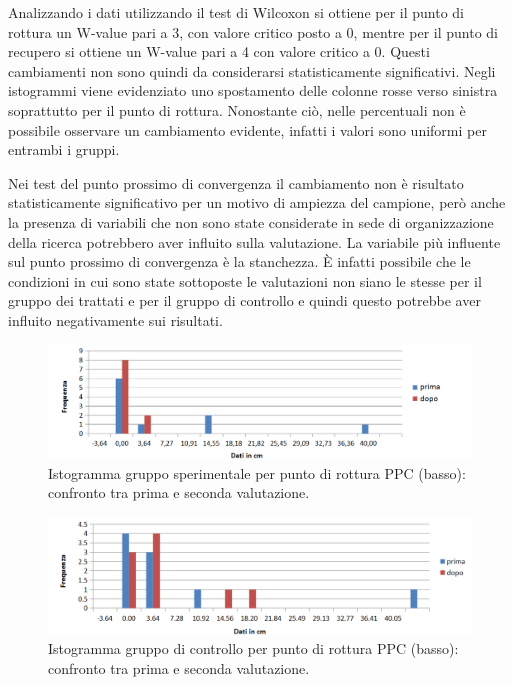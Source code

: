 Analizzando i dati utilizzando il test di Wilcoxon si ottiene per il punto di rottura un W-value pari a 3, con valore critico posto a 0, mentre per il punto di recupero si ottiene un W-value pari a 4 con valore critico a 0. Questi cambiamenti non sono quindi da considerarsi statisticamente significativi. Negli istogrammi viene evidenziato uno spostamento delle colonne rosse verso sinistra soprattutto per il punto di rottura. Nonostante ciò, nelle percentuali non è possibile osservare un cambiamento evidente, infatti i valori sono uniformi per entrambi i gruppi. 

Nei test del punto prossimo di convergenza il cambiamento non è risultato statisticamente significativo per un motivo di ampiezza del campione, però anche la presenza di variabili che non sono state considerate in sede di organizzazione della ricerca potrebbero aver influito sulla valutazione. La variabile più influente sul punto prossimo di convergenza è la stanchezza. È infatti possibile che le condizioni in cui sono state sottoposte le valutazioni non siano le stesse per il gruppo dei trattati e per il gruppo di controllo e quindi questo potrebbe aver influito negativamente sui risultati.
 \begin{figure}[h!]
	\centering
	\includegraphics[scale=0.38]{source/grafici/PPC_BASSO_DEFINITIVO.png}
	\caption[Istogramma gruppo sperimentale per punto di rottura PPC (basso)]{Istogramma gruppo sperimentale per punto di rottura PPC (basso): confronto tra prima e seconda valutazione.}
	\label{fig:issuexample}
\end{figure}
 \begin{figure}[h!]
	\centering
	\includegraphics[scale=0.38]{source/grafici/PPC_BASSO_CONTROLLO.png}
	\caption[Istogramma gruppo di controllo per punto di rottura PPC (basso)]{Istogramma gruppo di controllo per punto di rottura PPC (basso): confronto tra prima e seconda valutazione.}
	\label{fig:issuexample}
\end{figure}
